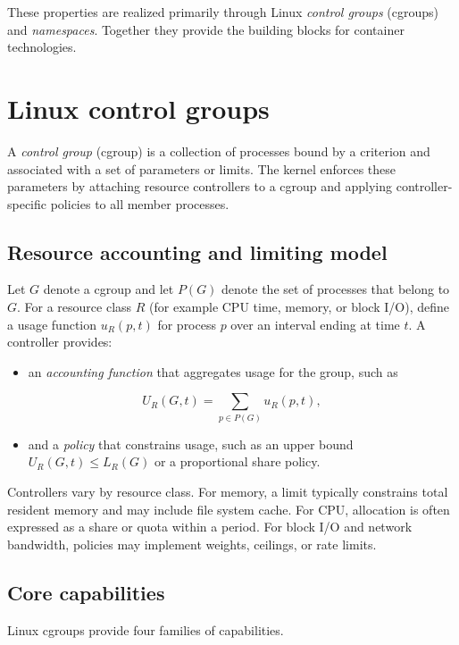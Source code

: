 \documentclass[11pt,a4paper,openany]{report}
\begin{document}
These properties are realized primarily through Linux \emph{control groups} (cgroups) and \emph{namespaces}. Together they provide the building blocks for container technologies.

\section{Linux control groups}

A \emph{control group} (cgroup) is a collection of processes bound by a criterion and associated with a set of parameters or limits. The kernel enforces these parameters by attaching resource controllers to a cgroup and applying controller-specific policies to all member processes.

\subsection{Resource accounting and limiting model}

Let $G$ denote a cgroup and let $P(G)$ denote the set of processes that belong to $G$. For a resource class $R$ (for example CPU time, memory, or block I/O), define a usage function $u_R(p, t)$ for process $p$ over an interval ending at time $t$. A controller provides:

\begin{itemize}
\item an \emph{accounting function} that aggregates usage for the group, such as
\end{itemize}

\[ U_R(G, t) = \sum_{p \in P(G)} u_R(p, t), \]

\begin{itemize}
\item and a \emph{policy} that constrains usage, such as an upper bound $U_R(G, t) \le L_R(G)$ or a proportional share policy.
\end{itemize}

Controllers vary by resource class. For memory, a limit typically constrains total resident memory and may include file system cache. For CPU, allocation is often expressed as a share or quota within a period. For block I/O and network bandwidth, policies may implement weights, ceilings, or rate limits.

\subsection{Core capabilities}

Linux cgroups provide four families of capabilities.
\end{document}
